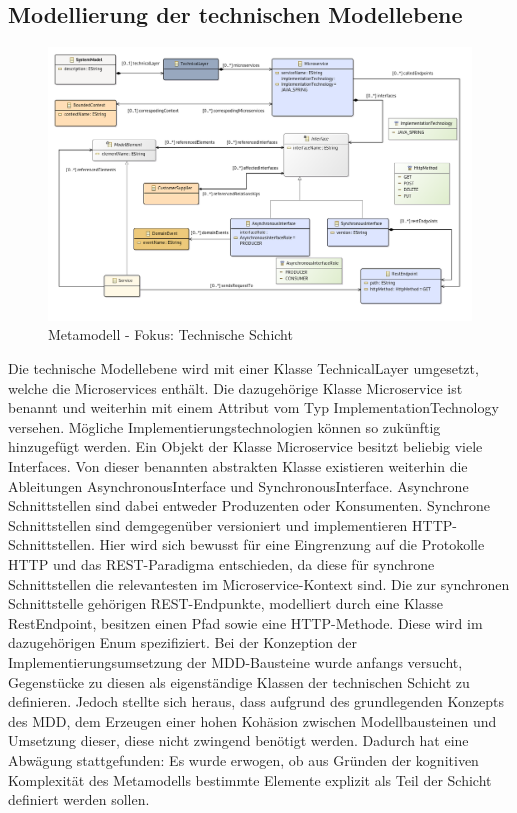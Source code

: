 
\newpage
\subsection{Modellierung der technischen Modellebene}

\begin{figure}[ht]
\centering
\includegraphics[width=\textwidth]{bilder/k4/5.png}
\caption{Metamodell - Fokus: Technische Schicht}
\end{figure}

Die technische Modellebene wird mit einer Klasse \glqq TechnicalLayer\grqq{} umgesetzt, welche die Microservices enthält. Die dazugehörige Klasse \glqq Microservice\grqq{} ist benannt und weiterhin mit einem Attribut vom Typ \glqq ImplementationTechnology\grqq{} versehen. Mögliche Implementierungstechnologien können so zukünftig hinzugefügt werden. Ein Objekt der Klasse Microservice besitzt beliebig viele \glqq Interfaces\grqq{}. Von dieser benannten abstrakten Klasse existieren weiterhin die Ableitungen \glqq AsynchronousInterface\grqq{} und \glqq SynchronousInterface\grqq{}. Asynchrone Schnittstellen sind dabei entweder Produzenten oder Konsumenten. Synchrone Schnittstellen sind demgegenüber versioniert und implementieren HTTP-Schnittstellen. Hier wird sich bewusst für eine Eingrenzung auf die Protokolle HTTP und das REST-Paradigma entschieden, da diese für synchrone Schnittstellen die relevantesten im Microservice-Kontext sind. Die zur synchronen Schnittstelle gehörigen REST-Endpunkte, modelliert durch eine Klasse \glqq RestEndpoint\grqq{}, besitzen einen Pfad sowie eine HTTP-Methode. Diese wird im dazugehörigen Enum spezifiziert. Bei der Konzeption der Implementierungsumsetzung der MDD-Bausteine wurde anfangs versucht, Gegenstücke zu diesen als eigenständige Klassen der technischen Schicht zu definieren. Jedoch stellte sich heraus, dass aufgrund des grundlegenden Konzepts des MDD, dem Erzeugen einer hohen Kohäsion zwischen Modellbausteinen und Umsetzung dieser, diese nicht zwingend benötigt werden. Dadurch hat eine Abwägung stattgefunden: Es wurde erwogen, ob aus Gründen der kognitiven Komplexität des Metamodells bestimmte Elemente explizit als Teil der Schicht definiert werden sollen.

